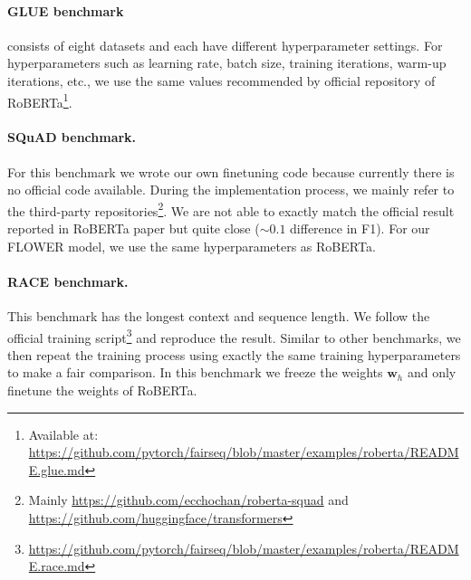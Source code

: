 \documentclass[11pt]{article}
\def\vw{{\bm{w}}}
\begin{document}
\paragraph{GLUE benchmark}consists of eight datasets and each have different hyperparameter settings. For hyperparameters such as learning rate, batch size, training iterations, warm-up iterations, etc., we use the same values recommended by official repository of RoBERTa\footnote{Available at: \url{https://github.com/pytorch/fairseq/blob/master/examples/roberta/README.glue.md}}. 
\paragraph{SQuAD benchmark.} For this benchmark we wrote our own finetuning code because currently there is no official code available. During the implementation process, we mainly refer to the third-party repositories\footnote{ Mainly \url{https://github.com/ecchochan/roberta-squad} and \url{https://github.com/huggingface/transformers}}. We are not able to exactly match the official result reported in RoBERTa paper but quite close (${\sim}0.1$ difference in F1). For our FLOWER model, we use the same hyperparameters as RoBERTa.
\paragraph{RACE benchmark.} This benchmark has the longest context and sequence length. We follow the official training script\footnote{\url{https://github.com/pytorch/fairseq/blob/master/examples/roberta/README.race.md}} and reproduce the result. Similar to other benchmarks, we then repeat the training process using exactly the same training hyperparameters to make a fair comparison. In this benchmark we freeze the weights $\vw_h$ and only finetune the weights of RoBERTa.
\end{document}
